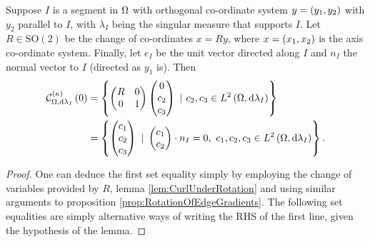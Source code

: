 \begin{lemma} \label{lem:kCurlZeroAnySegment}
	Suppose $I$ is a segment in $\Omega$ with orthogonal co-ordinate system $y=\left( y_1,y_2 \right)$ with $y_2$ parallel to $I$, with $\lambda_I$ being the singular measure that supports $I$. 
	Let $R\in\mathrm{SO}(2)$ be the change of co-ordinates $x=Ry$, where $x=\left( x_1,x_2 \right)$ is the axis co-ordinate system.
	Finally, let $e_I$ be the unit vector directed along $I$ and $n_I$ the normal vector to $I$ (directed as $y_1$ is).
	Then
	\begin{align*}
		\mathcal{C}_{ \Omega, \mathrm{d}\lambda_I}^{(\kappa)}\left( 0 \right) &= 
		\left\{ 
		\begin{pmatrix} R & 0 \\ 0 & 1 \end{pmatrix}\begin{pmatrix} 0 \\ c_2 \\ c_3 \end{pmatrix} 
		\ \vert \ c_2,c_3\in L^{2}\left( \Omega,\mathrm{d}\lambda_I \right)
		 \right\} \\
		&= \left\{ 
		\begin{pmatrix} c_1 \\ c_2 \\ c_3 \end{pmatrix}
		\ \vert \ \begin{pmatrix} c_1 \\ c_2 \end{pmatrix}\cdot n_I = 0, \ c_1,c_2,c_3\in L^{2}\left( \Omega,\mathrm{d}\lambda_I \right)
		 \right\}.
	\end{align*}
\end{lemma}
\begin{proof}
	One can deduce the first set equality simply by employing the change of variables provided by $R$, lemma \ref{lem:CurlUnderRotation} and using similar arguments to proposition \ref{prop:RotationOfEdgeGradients}.
	The following set equalities are simply alternative ways of writing the RHS of the first line, given the hypothesis of the lemma.
\end{proof}

